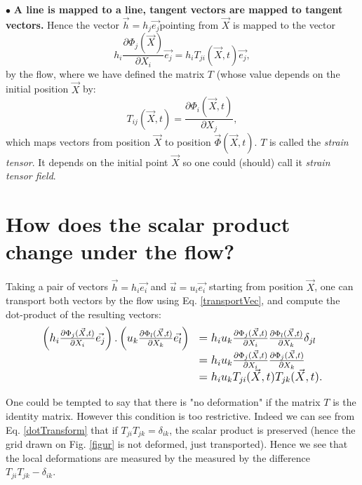 \documentclass[DIV=12]{article}
\begin{document}
$\bullet$ {\bf{A line is mapped to a line, tangent vectors are mapped to tangent vectors.}}
 Hence the vector $\vec{h} = h_j\vec{e_j}$pointing from $\vec{X}$ is mapped to 
 the vector 
\begin{equation}
h_i \frac{\partial \Phi_j( \vec{X})}{\partial X_i} \vec{e_j} = h_i T_{ji} (\vec{X},t) \vec{e_j},
\label{transportVec}
\end{equation}
 by the flow, where we have defined 
 the matrix $T$ (whose value depends on the initial position $\vec{X}$ by:\\
\begin{equation}
 T_{ij} (\vec{X},t)=  \frac{\partial \Phi_i( \vec{X},t)} {\partial X_j},
 \label{equation}
\end{equation}
which maps vectors from position $\vec{X}$ to position $\vec{\Phi}(\vec{X},t)$.
 $T$ is called the {\emph{strain tensor}}. It depends on the initial point $\vec{X}$ 
 so one could (should) call it {\emph{strain tensor field}}.

\section{How does the scalar product change under the flow?}

 Taking a pair of vectors $\vec{h} = h_i\vec{e_i}$ and $\vec{u} = u_i \vec{e_i}$
 starting from position $\vec{X}$, one can transport both vectors by the flow
 using Eq. \ref{transportVec}, and compute the dot-product of the resulting vectors:\\
\begin{equation}
\large{
   \begin{array}{ll}
 \left( h_i \frac{\partial \Phi_j( \vec{X},t)}{\partial X_i} \vec{e_j} \right) .\left( u_k \frac{\partial \Phi_l( \vec{X},t)}{\partial X_k} \vec{e_l}\right) &= h_i u_k\frac{\partial \Phi_j( \vec{X},t)}{\partial X_i}\frac{\partial \Phi_l( \vec{X},t)}{\partial X_k}\delta_{jl} \\
 &=  h_i u_k\frac{\partial \Phi_j( \vec{X},t)} {\partial X_i}\frac{\partial \Phi_j( \vec{X},t)}{\partial X_k}\\
& =  h_i u_k  T_{ji}(\vec{X},t) T_{jk}(\vec{X},t).
\end{array}}
\label{dotTransform}
\end{equation}


 One could be tempted to say that there is "no deformation" if the matrix $T$ is the identity matrix. However this
condition is too restrictive. Indeed we can see from Eq. \ref{dotTransform}
 that if $T_{ji}T_{jk} = \delta_{ik}$, the scalar product is preserved (hence the grid drawn on Fig. \ref{figur}
 is not deformed, just transported). Hence we see that the local deformations
 are measured by the measured by the difference $T_{ji}T_{jk} - \delta_{ik}$.
\end{document}
